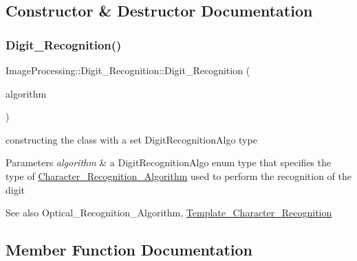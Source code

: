 \subsection{Constructor \& Destructor Documentation}
\mbox{\label{class_image_processing_1_1_digit___recognition_a24fef82ef6c94ddda8c841f9eb408872}} 
\subsubsection{\texorpdfstring{Digit\+\_\+\+Recognition()}{Digit\_Recognition()}}
{\footnotesize\ttfamily Image\+Processing\+::\+Digit\+\_\+\+Recognition\+::\+Digit\+\_\+\+Recognition (\begin{DoxyParamCaption}\item[{\mbox{\hyperlink{namespace_image_processing_afe66b5cb462eb22dcf108308418c09eb}{Digit\+Recognition\+Algo}}}]{algorithm }\end{DoxyParamCaption})}



constructing the class with a set Digit\+Recognition\+Algo type 


\begin{DoxyParams}{Parameters}
{\em algorithm} & a Digit\+Recognition\+Algo enum type that specifies the type of \mbox{\hyperlink{class_image_processing_1_1_character___recognition___algorithm}{Character\+\_\+\+Recognition\+\_\+\+Algorithm}} used to perform the recognition of the digit \\
\hline
\end{DoxyParams}
\begin{DoxySeeAlso}{See also}
Optical\+\_\+\+Recognition\+\_\+\+Algorithm, \mbox{\hyperlink{class_image_processing_1_1_template___character___recognition}{Template\+\_\+\+Character\+\_\+\+Recognition}} 
\end{DoxySeeAlso}


\subsection{Member Function Documentation}
\mbox{\label{class_image_processing_1_1_digit___recognition_a365719825f80b3f5c503d88b43b5fc25}} 
